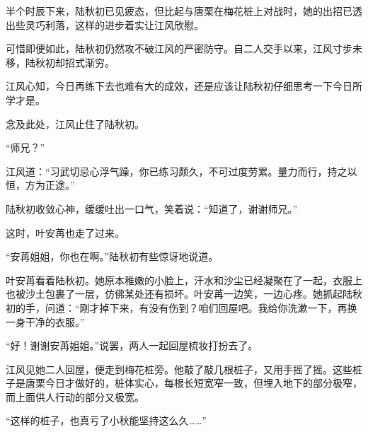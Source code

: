 半个时辰下来，陆秋初已见疲态，但比起与唐栗在梅花桩上对战时，她的出招已透出些灵巧利落，这样的进步着实让江风欣慰。

可惜即便如此，陆秋初仍然攻不破江风的严密防守。自二人交手以来，江风寸步未移，陆秋初却招式渐穷。

江风心知，今日再练下去也难有大的成效，还是应该让陆秋初仔细思考一下今日所学才是。

念及此处，江风止住了陆秋初。

“师兄？”

江风道：“习武切忌心浮气躁，你已练习颇久，不可过度劳累。量力而行，持之以恒，方为正途。”

陆秋初收敛心神，缓缓吐出一口气，笑着说：“知道了，谢谢师兄。”

这时，叶安苒也走了过来。

“安苒姐姐，你也在啊。”陆秋初有些惊讶地说道。

叶安苒看着陆秋初。她原本稚嫩的小脸上，汗水和沙尘已经凝聚在了一起，衣服上也被沙土包裹了一层，仿佛某处还有损坏。叶安苒一边笑，一边心疼。她抓起陆秋初的手，问道：“刚才掉下来，有没有伤到？咱们回屋吧。我给你洗漱一下，再换一身干净的衣服。”

“好！谢谢安苒姐姐。”说罢，两人一起回屋梳妆打扮去了。

江风见她二人回屋，便走到梅花桩旁。他敲了敲几根桩子，又用手摇了摇。这些桩子是唐栗今日才做好的，桩体实心，每根长短宽窄一致，但埋入地下的部分极窄，而上面供人行动的部分又极宽。

“这样的桩子，也真亏了小秋能坚持这么久……”